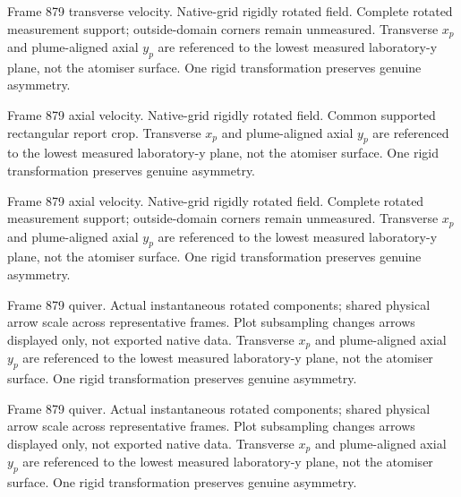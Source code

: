 \caption{Frame 879 transverse velocity. Native-grid rigidly rotated field. Complete rotated measurement support; outside-domain corners remain unmeasured. Transverse $x_p$ and plume-aligned axial $y_p$ are referenced to the lowest measured laboratory-y plane, not the atomiser surface. One rigid transformation preserves genuine asymmetry.}

\caption{Frame 879 axial velocity. Native-grid rigidly rotated field. Common supported rectangular report crop. Transverse $x_p$ and plume-aligned axial $y_p$ are referenced to the lowest measured laboratory-y plane, not the atomiser surface. One rigid transformation preserves genuine asymmetry.}

\caption{Frame 879 axial velocity. Native-grid rigidly rotated field. Complete rotated measurement support; outside-domain corners remain unmeasured. Transverse $x_p$ and plume-aligned axial $y_p$ are referenced to the lowest measured laboratory-y plane, not the atomiser surface. One rigid transformation preserves genuine asymmetry.}

\caption{Frame 879 quiver. Actual instantaneous rotated components; shared physical arrow scale across representative frames. Plot subsampling changes arrows displayed only, not exported native data. Transverse $x_p$ and plume-aligned axial $y_p$ are referenced to the lowest measured laboratory-y plane, not the atomiser surface. One rigid transformation preserves genuine asymmetry.}

\caption{Frame 879 quiver. Actual instantaneous rotated components; shared physical arrow scale across representative frames. Plot subsampling changes arrows displayed only, not exported native data. Transverse $x_p$ and plume-aligned axial $y_p$ are referenced to the lowest measured laboratory-y plane, not the atomiser surface. One rigid transformation preserves genuine asymmetry.}
